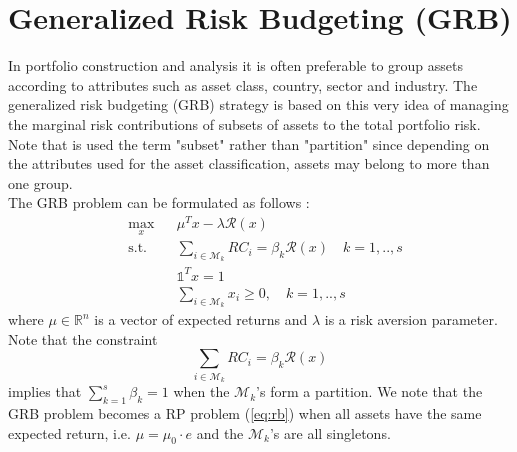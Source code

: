 \section{Generalized Risk Budgeting (GRB)}
In portfolio construction and analysis it is often preferable to group assets according to attributes such as asset class, country, sector and industry. The generalized risk budgeting (GRB) strategy is based on this very idea of managing the marginal risk contributions of subsets of assets to the total portfolio risk. Note that is used the term "subset" rather than "partition" since depending on the attributes used for the asset classification, assets may belong to more than one group.\\
The GRB problem can be formulated as follows \cite{sdp}:
\begin{equation}
\begin{aligned}
& \underset{x}{\text{max}}
&& \mu^Tx - \lambda\mathcal{R}(x)\\
& \text{s.t.}
&&\sum_{i \in \mathcal{M}_k} RC_i = \beta_k \mathcal{R}(x) \quad k=1,..,s\\
&&&\mathds{1}^T x = 1\\
&&&\sum_{i \in \mathcal{M}_k} x_i \geq 0, \quad k=1,..,s
\end{aligned}
\end{equation}
where $\mu \in \mathbb{R}^n$ is a vector of expected returns and $\lambda$ is a risk aversion parameter. Note that the constraint
\begin{equation}
\sum_{i \in \mathcal{M}_k} RC_i = \beta_k \mathcal{R}(x)
\end{equation}
implies that $\sum_{k=1}^s \beta_k =1$ when the $\mathcal{M}_k$'s form a partition. We note that the GRB problem becomes a RP problem (\ref{eq:rb}) when all assets have the same expected return, i.e. $\mu = \mu_0 \cdot e$ and the $\mathcal{M}_k$'s are all singletons.